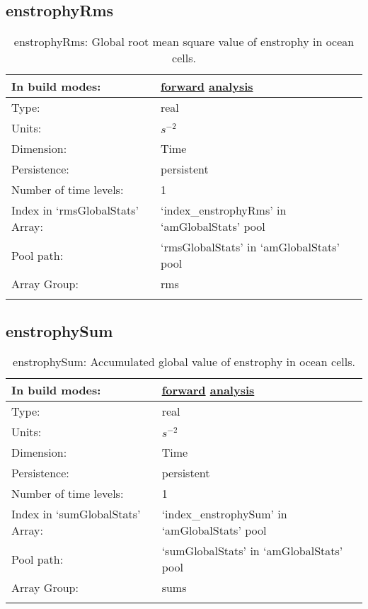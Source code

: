 \subsection[enstrophyRms]{enstrophyRms}
\label{subsec:var_sec_amGlobalStats_enstrophyRms}
\begin{center}
\begin{longtable}{| p{2.0in} | p{4.0in} |}
        \hline 
        In build modes: & \hyperref[subsec:forward_var_tab_amGlobalStats]{forward} \hyperref[subsec:analysis_var_tab_amGlobalStats]{analysis} \\
        \hline 
        Type: & real \\
        \hline 
        Units: & $s^{-2}$ \\
        \hline 
        Dimension: & Time \\
        \hline 
        Persistence: & persistent \\
        \hline 
        Number of time levels: & 1 \\
        \hline 
		 Index in `rmsGlobalStats' Array: & `index\_enstrophyRms' in `amGlobalStats' pool \\
		 \hline 
            Pool path: & `rmsGlobalStats' in `amGlobalStats' pool \\
		 \hline 
		 Array Group: & rms \\
		 \hline 
    \caption{enstrophyRms: Global root mean square value of enstrophy in ocean cells.}
\end{longtable}
\end{center}
\subsection[enstrophySum]{enstrophySum}
\label{subsec:var_sec_amGlobalStats_enstrophySum}
\begin{center}
\begin{longtable}{| p{2.0in} | p{4.0in} |}
        \hline 
        In build modes: & \hyperref[subsec:forward_var_tab_amGlobalStats]{forward} \hyperref[subsec:analysis_var_tab_amGlobalStats]{analysis} \\
        \hline 
        Type: & real \\
        \hline 
        Units: & $s^{-2}$ \\
        \hline 
        Dimension: & Time \\
        \hline 
        Persistence: & persistent \\
        \hline 
        Number of time levels: & 1 \\
        \hline 
		 Index in `sumGlobalStats' Array: & `index\_enstrophySum' in `amGlobalStats' pool \\
		 \hline 
            Pool path: & `sumGlobalStats' in `amGlobalStats' pool \\
		 \hline 
		 Array Group: & sums \\
		 \hline 
    \caption{enstrophySum: Accumulated global value of enstrophy in ocean cells.}
\end{longtable}
\end{center}
